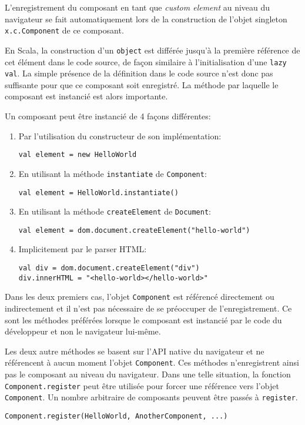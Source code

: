 L'enregistrement du composant en tant que \emph{custom element} au niveau du navigateur se fait automatiquement lors de la construction de l'objet singleton \texttt{x.c.Component} de ce composant.

En Scala, la construction d'un \texttt{object} est différée jusqu'à la première référence de cet élément dans le code source, de façon similaire à l'initialisation d'une \texttt{lazy val}. La simple présence de la définition dans le code source n'est donc pas suffisante pour que ce composant soit enregistré. La méthode par laquelle le composant est instancié est alors importante.

Un composant peut être instancié de 4 façons différentes:
\begin{enumerate}
	\item Par l'utilisation du constructeur de son implémentation:
	\begin{lstlisting}
val element = new HelloWorld
	\end{lstlisting}
	\item En utilisant la méthode \texttt{instantiate} de \texttt{Component}:
	\begin{lstlisting}
val element = HelloWorld.instantiate()
	\end{lstlisting}
	\item En utilisant la méthode \texttt{createElement} de \texttt{Document}:
	\begin{lstlisting}
val element = dom.document.createElement("hello-world")
	\end{lstlisting}
	\item Implicitement par le parser HTML:
	\begin{lstlisting}
val div = dom.document.createElement("div")
div.innerHTML = "<hello-world></hello-world>"
	\end{lstlisting}
\end{enumerate}

Dans les deux premiers cas, l'objet \texttt{Component} est référencé directement ou indirectement et il n'est pas nécessaire de se préoccuper de l'enregistrement. Ce sont les méthodes préférées lorsque le composant est instancié par le code du développeur et non le navigateur lui-même.

Les deux autre méthodes se basent sur l'API native du navigateur et ne référencent à aucun moment l'objet \texttt{Component}. Ces méthodes n'enregistrent ainsi pas le composant au niveau du navigateur. Dans une telle situation, la fonction \texttt{Component.register} peut être utilisée pour forcer une référence vers l'objet \texttt{Component}. Un nombre arbitraire de composants peuvent être passés à \texttt{register}.
\begin{lstlisting}
Component.register(HelloWorld, AnotherComponent, ...)
\end{lstlisting}


